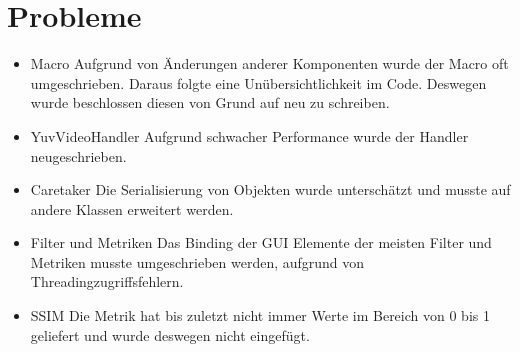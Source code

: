 \chapter{Probleme}
\begin{itemize}
\item Macro \newline
Aufgrund von Änderungen anderer Komponenten wurde der Macro oft umgeschrieben.
Daraus folgte eine Unübersichtlichkeit im Code.
Deswegen wurde beschlossen diesen von Grund auf neu zu schreiben.
\item YuvVideoHandler \newline
Aufgrund schwacher Performance wurde der Handler neugeschrieben.
\item Caretaker \newline
Die Serialisierung von Objekten wurde unterschätzt und musste auf andere Klassen erweitert werden.
\item Filter und Metriken  \newline
Das Binding der GUI Elemente der meisten Filter und Metriken musste umgeschrieben werden, aufgrund von Threadingzugriffsfehlern.
\item SSIM \newline
Die Metrik hat bis zuletzt nicht immer Werte im Bereich von 0 bis 1 geliefert und wurde deswegen nicht eingefügt.
\end{itemize}